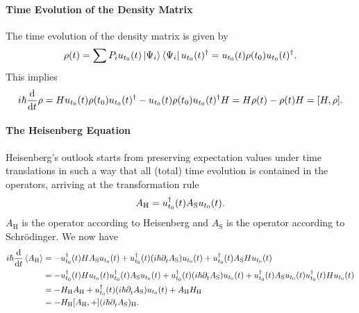 \paragraph{Time Evolution of the Density Matrix}
The time evolution of the density matrix is given by
\begin{align*}
	\rho(t) = \sum P_{i}u_{t_{0}}(t)\ket{\Psi_{i}}\bra{\Psi_{i}}u_{t_{0}}(t)^{\dagger} = u_{t_{0}}(t)\rho(t_{0})u_{t_{0}}(t)^{\dagger}.
\end{align*}
This implies
\begin{align*}
	i\hbar\dv{t}\rho = Hu_{t_{0}}(t)\rho(t_{0})\adj{u_{t_{0}}(t)} - u_{t_{0}}(t)\rho(t_{0})\adj{u_{t_{0}}(t)}H = H\rho(t) - \rho(t)H = \comm{H}{\rho}.
\end{align*}

\paragraph{The Heisenberg Equation}
Heisenberg's outlook starts from preserving expectation values under time translations in such a way that all (total) time evolution is contained in the operators, arriving at the transformation rule
\begin{align*}
	A_{\text{H}} = u_{t_{0}}^{\dagger}(t)A_{\text{S}}u_{t_{0}}(t).
\end{align*}
$A_{\text{H}}$ is the operator according to Heisenberg and $A_{\text{S}}$ is the operator according to Schrödinger. We now have
\begin{align*}
	i\hbar\dv{t}\expval{A_{\text{H}}} &= -\adj{u_{t_{0}}}(t)HA_{\text{S}}u_{t_{0}}(t) + \adj{u_{t_{0}}}(t)(i\hbar\del{t}{A_{\text{S}}})u_{t_{0}}(t) + \adj{u_{t_{0}}}(t)A_{\text{S}}Hu_{t_{0}}(t) \\
	                                  &= -\adj{u_{t_{0}}}(t)Hu_{t_{0}}(t)\adj{u_{t_{0}}}(t)A_{\text{S}}u_{t_{0}}(t) + \adj{u_{t_{0}}}(t)(i\hbar\del{t}{A_{\text{S}}})u_{t_{0}}(t) + \adj{u_{t_{0}}}(t)A_{\text{S}}u_{t_{0}}(t)\adj{u_{t_{0}}}(t)Hu_{t_{0}}(t) \\
	                                  &= -H_{\text{H}}A_{\text{H}} + \adj{u_{t_{0}}}(t)(i\hbar\del{t}{A_{\text{S}}})u_{t_{0}}(t) + A_{\text{H}}H_{\text{H}} \\
	                                  &= -{H_{\text{H}}}\comm{A_{\text{H}}} + (i\hbar\del{t}{A_{\text{S}}})_{\text{H}}.
\end{align*}


